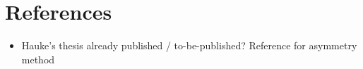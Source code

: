 \documentclass[
a4,
oneside,
headsepline,     %
normalheadings,
openany,
numbers=noenddot %
]{scrreprt} %
\begin{document}
\section{References}
\begin{itemize}
\item Hauke's thesis already published / to-be-published? Reference
  for asymmetry method
\end{itemize}



\end{document}
